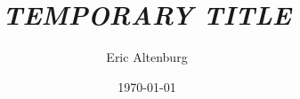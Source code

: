 \documentclass[12pt]{turabian-researchpaper}
\title{\textit{\textbf{TEMPORARY TITLE}}}
\author{Eric Altenburg}
\date{\today}
\begin{document}
\maketitle

\newpage

\begin{thebibliography}{0}
\end{thebibliography}
\end{document}
